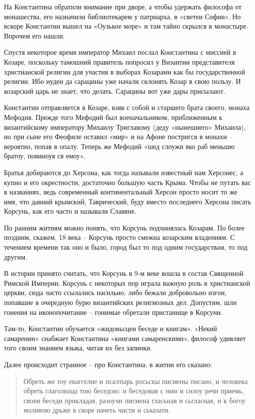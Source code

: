 На Константина обратили внимание при дворе, а чтобы удержать философа от монашества, его назначили библиотекарем у патриарха, в «светеи Софии». Но вскоре Константин вышел на «Оузькое море» и там тайно скрылся в монастыре. Впрочем его нашли.
 
Спустя некоторое время император Михаил послал Константина с миссией в Козаре, поскольку тамошний правитель попросил у Византии представителя христианской религии для участия в выборах Козарами как бы государственной религии. Ибо иудеи да сарацины уже начали склонять Козар в свою пользу. И козарский царь не знает, что делать. Сарацины вот уже дары присылают.

Константин отправляется в Козаре, взяв с собой и старшего брата своего, монаха Мефодия. Прежде того Мефодий был военачальником, приближенным к византийскому императору Михаилу Триглавому (деду «нынешнего» Михаила), но при сыне его Феофиле оставил «мир» и на Афоне постригся в монахи – вероятно, попав в опалу. Теперь же Мефодий «шед слоужи яко раб меньшю братоу, повиноуя ся емоу».

Братья добираются до Херсона, как тогда называли известный нам Херсонес, а купно и его окрестности, достаточно большую часть Крыма. Чтобы не путать вас в названиях, ведь современный континентальный Херсон просто носит то же имя, что давний крымский, Таврический, буду вместо последнего Херсона писать Корсунь, как его часто и называли Славяне.

По ранним житиям можно понять, что Корсунь подчинялась Козарам. По более поздним, скажем, 18 века – Корсунь просто смежна козарским владениям. С течением времени так оно и было, город был то под одним государствам, то под другим. 

В истории принято считать, что Корсунь в 9-м веке вошла в состав Священной Римской Империи. Корсунь с некоторых пор играла важную роль в христианской церкви, сюда часто ссылались насильно, либо бежали добровольно изгои, попавшие в очередную бурю византийских религиозных дел. Допустим, шли гонения на иконопочитание – гонимые обретали пристанище в Корсуни.

Там-то, Константин обучается «жидовьсцеи беседе и книгам». «Некий самаренин» снабжает Константина «книгами самаренскими», философ удивляет того своим знанием языка, читая их без запинки.

Далее происходит странное – про Константина, в житии его сказано\cite{teodorov01}:

\begin{quotation}
Обреть же тоу еваггелие и псалтырь росьскы писмены писано, и человека обреть глаголюща тою беседою: и беседовав с ним и силоу речи приемь, своеи беседи прикладая, разоучи писмена гласьная и сьгласная, и к богоу моливою дрьже в скоре начеть чисти и ськазати.
\end{quotation}

